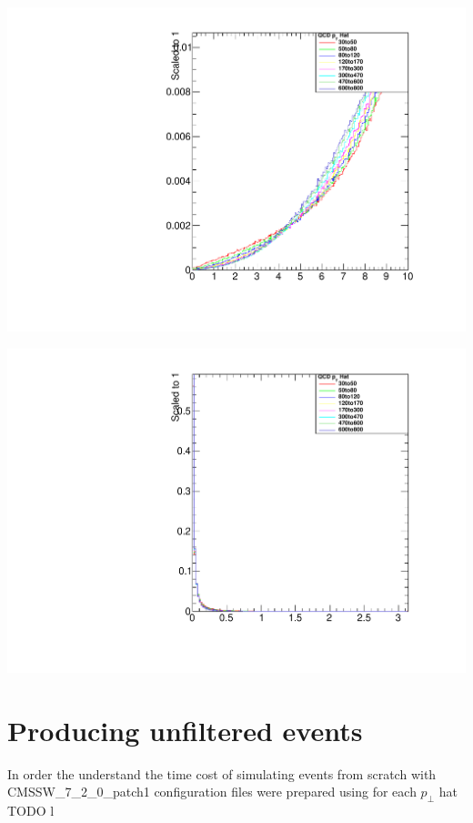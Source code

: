 \documentclass[a4paper]{article}
\begin{document}
\begin{minipage}{.5\textwidth}
  \centering
  \includegraphics[width=1.0\linewidth]{img/Dijet_MaxDEta.pdf}
\end{minipage}%
\begin{minipage}{0.5\textwidth}
  \centering
  \includegraphics[width=1.0\linewidth]{img/Dijet_MinDPhi.pdf}
\end{minipage}


\section{Producing unfiltered events}

In order the understand the time cost of simulating events from scratch with CMSSW\_7\_2\_0\_patch1 configuration files were prepared using for each $p_\perp$ hat TODO
l

\end{document}
